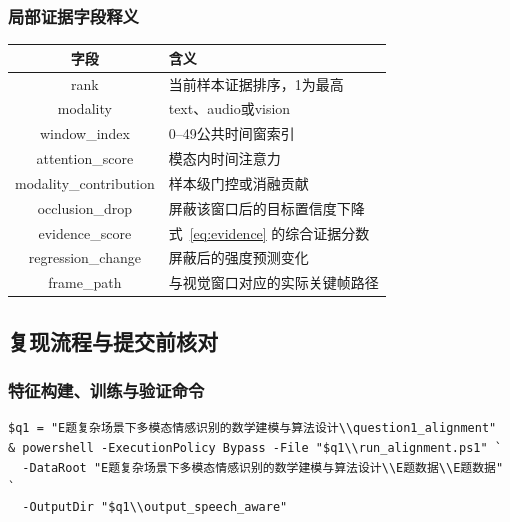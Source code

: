 \documentclass{gmcmthesis}
\newcommand{\E}{\mathbb{E}}
\begin{document}
\begin{appendices}
\subsubsection{局部证据字段释义}
\begin{center}
\begin{tabularx}{0.96\textwidth}{cY}
\toprule 字段 & 含义 \\
\midrule
rank & 当前样本证据排序，1为最高 \\
modality & text、audio或vision \\
window\_index & 0--49公共时间窗索引 \\
attention\_score & 模态内时间注意力 \\
modality\_contribution & 样本级门控或消融贡献 \\
occlusion\_drop & 屏蔽该窗口后的目标置信度下降 \\
evidence\_score & 式~\eqref{eq:evidence} 的综合证据分数 \\
regression\_change & 屏蔽后的强度预测变化 \\
frame\_path & 与视觉窗口对应的实际关键帧路径 \\
\bottomrule
\end{tabularx}
\end{center}
\subsection{复现流程与提交前核对}
\subsubsection{特征构建、训练与验证命令}
\begin{verbatim}
$q1 = "E题复杂场景下多模态情感识别的数学建模与算法设计\\question1_alignment"
& powershell -ExecutionPolicy Bypass -File "$q1\\run_alignment.ps1" `
  -DataRoot "E题复杂场景下多模态情感识别的数学建模与算法设计\\E题数据\\E题数据" `
  -OutputDir "$q1\\output_speech_aware"


\end{verbatim}
\end{appendices}
\end{document}
